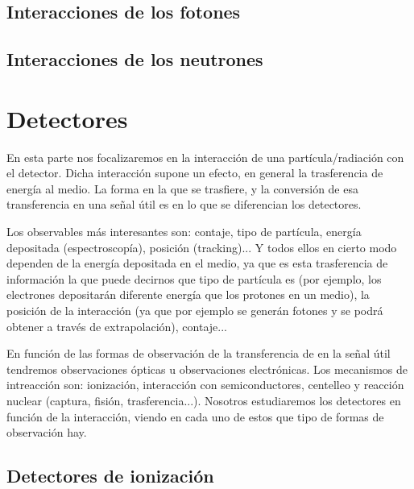      
\subsection{Interacciones de los fotones}



\subsection{Interacciones de los neutrones}



\section{Detectores}

En esta parte nos focalizaremos en la interacción de una partícula/radiación con el detector. Dicha interacción supone un efecto, en general la trasferencia de energía al medio. La forma en la que se trasfiere, y la conversión de esa transferencia en una señal útil es en lo que se diferencian los detectores. 

Los observables más interesantes son: contaje, tipo de partícula, energía depositada (espectroscopía), posición (tracking)... Y todos ellos en cierto modo dependen de la energía depositada en el medio, ya que es esta trasferencia de información la que puede decirnos que tipo de partícula es (por ejemplo, los electrones depositarán diferente energía que los protones en un medio), la posición de la interacción (ya que por ejemplo se generán fotones y se podrá obtener a través de extrapolación), contaje... 

En función de las formas de observación de la transferencia de en la señal útil tendremos observaciones ópticas u observaciones electrónicas. Los mecanismos de intreacción son: ionización, interacción con semiconductores, centelleo y reacción nuclear (captura, fisión, trasferencia...). Nosotros estudiaremos los detectores en función de la interacción, viendo en cada uno de estos que tipo de formas de observación hay. 

\subsection{Detectores de ionización}

